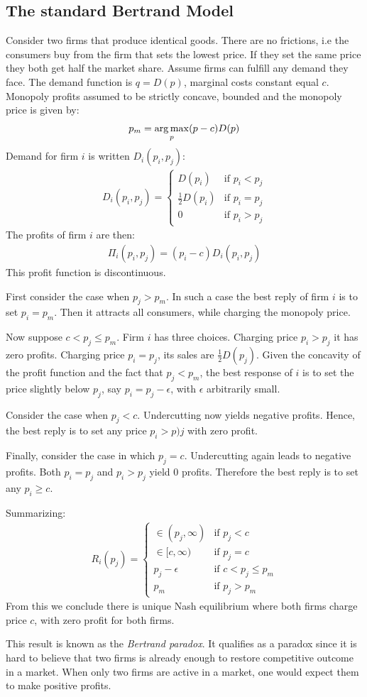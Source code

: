 \subsection{The standard Bertrand Model}
Consider two firms that produce identical goods. There are no frictions, i.e
the consumers buy from the firm that sets the lowest price. If they set
the same price they both get half the market share. Assume firms can
fulfill any demand they face. The demand function is $q=D(p)$, marginal
costs constant equal $c$. Monopoly profits assumed to be strictly concave,
bounded and the monopoly price is given by:
\begin{align}
	p_m=\underset{p}{\operatorname*{arg\,max}}(p-c)D(p)
\end{align}
Demand for firm $i$ is written \(D_i(p_i,p_j)\):
\begin{align}
	D_i(p_i,p_j) =
	\begin{cases}
		D(p_i)            & \text{if }p_i<p_j \\
		\frac{1}{2}D(p_i) & \text{if }p_i=p_j \\
		0                 & \text{if }p_i>p_j
	\end{cases}
\end{align}
The profits of firm $i$ are then:
\begin{align}
	\Pi_i(p_i,p_j)=(p_i-c)D_i(p_i,p_j)
\end{align}
This profit function is discontinuous.

First consider the case when \(p_j>p_m\). In such a case the best
reply of firm \(i\) is to set \(p_i=p_m\). Then it attracts all consumers,
while charging the monopoly price.

Now suppose \(c<p_j\leq p_m\). Firm \(i\) has three choices. Charging
price \(p_i>p_j\) it has zero profits. Charging price \(p_i=p_j\),
its sales are \(\frac{1}{2}D(p_j)\). Given the concavity of the profit
function and the fact that \(p_j<p_m\), the best response of \(i\) is to
set the price slightly below \(p_j\), say \(p_i=p_j-\epsilon\), with
\(\epsilon\) arbitrarily small.

Consider the case when \(p_j<c\). Undercutting now yields negative profits.
Hence, the best reply is to set any price \(p_i>p)j\) with zero profit.

Finally, consider the case in which \(p_j=c\). Undercutting again leads
to negative profits. Both \(p_i=p_j\) and \(p_i>p_j\) yield 0 profits.
Therefore the best reply is to set any \(p_i\geq c\).

Summarizing:
\begin{align}
	R_i(p_j)=
	\begin{cases}
		\in(p_j,\infty) & \text{if }p_j<c         \\
		\in[c,\infty)   & \text{if }p_j=c         \\
		p_j-\epsilon    & \text{if }c<p_j\leq p_m \\
		p_m             & \text{if }p_j>p_m
	\end{cases}
\end{align}
From this we conclude there is unique Nash equilibrium where both firms
charge price \(c\), with zero profit for both firms.

This result is known as the \textit{Bertrand paradox}. It qualifies as a paradox
since it is hard to believe that two firms is already enough to restore
competitive outcome in a market. When only two firms are active in a
market, one would expect them to make positive profits.
